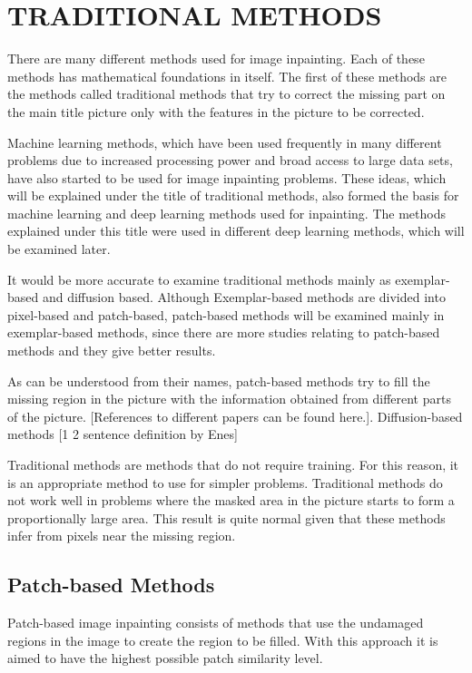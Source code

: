 \chapter{TRADITIONAL METHODS}\label{traditional_methods}

There are many different methods used for image inpainting. Each of these methods has mathematical foundations in itself. The first of these methods are the methods called traditional methods that try to correct the missing part on the main title picture only with the features in the picture to be corrected.

Machine learning methods, which have been used frequently in many different problems due to increased processing power and broad access to large data sets, have also started to be used for image inpainting problems. These ideas, which will be explained under the title of traditional methods, also formed the basis for machine learning and deep learning methods used for inpainting. The methods explained under this title were used in different deep learning methods, which will be examined later.

It would be more accurate to examine traditional methods mainly as exemplar-based and diffusion based. Although Exemplar-based methods are divided into pixel-based and patch-based, patch-based methods will be examined mainly in exemplar-based methods, since there are more studies relating to patch-based methods and they give better results.

As can be understood from their names, patch-based methods try to fill the missing region in the picture with the information obtained from different parts of the picture. [References to different papers can be found here.]. Diffusion-based methods [1 2 sentence definition by Enes]

Traditional methods are methods that do not require training. For this reason, it is an appropriate method to use for simpler problems. Traditional methods do not work well in problems where the masked area in the picture starts to form a proportionally large area. This result is quite normal given that these methods infer from pixels near the missing region.

\section{Patch-based Methods}

Patch-based image inpainting consists of methods that use the undamaged regions in the image to create the region to be filled. With this approach it is aimed to have the highest possible patch similarity level.

